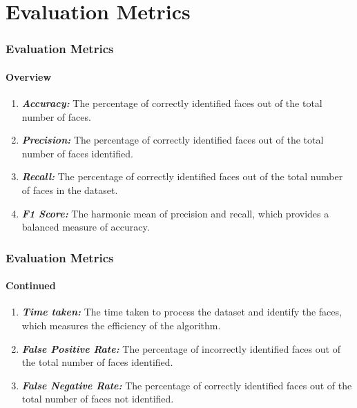 \documentclass[aspectratio=169]{beamer}
\begin{document}
\section{Evaluation Metrics}
\begin{frame}
	\centering
	\frametitle{Evaluation Metrics}
	\framesubtitle{Overview}
	\begin{minipage}{0.95\textwidth}
		\begin{enumerate}
			\item \textbf{\textit{Accuracy:}} The percentage of correctly identified faces out of the total number of faces.
			\item \textbf{\textit{Precision:}} The percentage of correctly identified faces out of the total number of faces identified.
			\item \textbf{\textit{Recall:}} The percentage of correctly identified faces out of the total number of faces in the dataset.
			\item \textbf{\textit{F1 Score:}} The harmonic mean of precision and recall, which provides a balanced measure of accuracy.
		\end{enumerate}
	\end{minipage}
\end{frame}
\begin{frame}
	\centering
	\frametitle{Evaluation Metrics}
	\framesubtitle{Continued}
	\begin{minipage}{0.95\textwidth}
		\begin{enumerate}
			\item \textbf{\textit{Time taken:}} The time taken to process the dataset and identify the faces, which measures the efficiency of the algorithm.
			\item \textbf{\textit{False Positive Rate:}} The percentage of incorrectly identified faces out of the total number of faces identified.
			\item \textbf{\textit{False Negative Rate:}} The percentage of correctly identified faces out of the total number of faces not identified.
		\end{enumerate}
	\end{minipage}
\end{frame}
\end{document}
